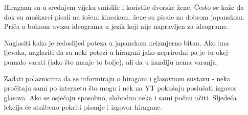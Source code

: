 	\vspace{10pt}
	Hiraganu su u srednjem vijeku smislile i koristile dvorske žene. Često se kaže da dok su muškarci pisali na lošem kineskom, žene su pisale na dobrom japanskom. Priča o bolnom uvozu ideograma u jezik koji nije napravljen za ideograme.
	
	\vspace{10pt}
	Naglasiti kako je redoslijed poteza u japanskom neizmjerno bitan. Ako ima ljevaka, naglasiti da su neki potezi u hiragani jako neprirodni pa je tu okej pomalo varati (iako što manje to bolje), ali da u kanđiju nema varanja.
	
	
	Zadati polaznicima da se informiraju o hiragani i glasovnom sustavu - neka pročitaju sami po internetu što mogu i nek na YT pokušaju poslušati izgovor glasova. Ako se osjećaju sposobno, slobodno neka i sami počnu učiti. Sljedeća lekcija će službeno pokriti pisanje i izgovor hiragane.

